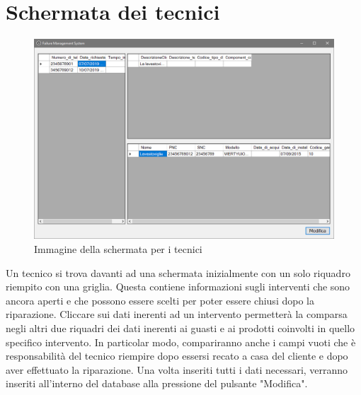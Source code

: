 \documentclass[a4paper, 12pt]{report}
\begin{document}
\section{Schermata dei tecnici}

\begin{figure}[H]
	\centering
	\includegraphics[width=\linewidth]{images/technicianScreen.png}
	\caption{Immagine della schermata per i tecnici}
\end{figure}

Un tecnico si trova davanti ad una schermata inizialmente con un solo riquadro riempito con una griglia. Questa contiene informazioni sugli interventi che sono ancora aperti e che
possono essere scelti per poter essere chiusi dopo la riparazione. Cliccare sui dati inerenti ad un intervento permetterà la comparsa negli altri due riquadri dei dati inerenti ai
guasti e ai prodotti coinvolti in quello specifico intervento. In particolar modo, compariranno anche i campi vuoti che è responsabilità del tecnico riempire dopo essersi recato a
casa del cliente e dopo aver effettuato la riparazione. Una volta inseriti tutti i dati necessari, verranno inseriti all'interno del database alla pressione del pulsante "Modifica".
\end{document}
